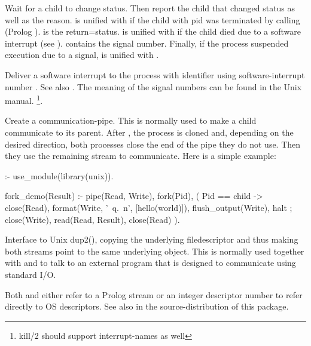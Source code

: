 \documentclass[11pt]{article}
\begin{document}
\begin{description}
Wait for a child to change status. Then report the child that changed
status as well as the reason.  is unified with
 if the child with pid  was terminated
by calling  (Prolog ).  is the
return=status.  is unified with  if
the child died due to a software interrupt (see ). 
contains the signal number. Finally, if the process suspended execution
due to a signal,  is unified with .

Deliver a software interrupt to the process with identifier 
using software-interrupt number .  See also .
The meaning of the signal numbers can be found in the Unix manual.%
\footnote{kill/2 should support interrupt-names as well}.

Create a communication-pipe. This is normally used to make a child
communicate to its parent. After , the process is cloned and,
depending on the desired direction, both processes close the end of the
pipe they do not use. Then they use the remaining stream to communicate.
Here is a simple example:

\begin{code}
:- use_module(library(unix)).

fork_demo(Result) :-
        pipe(Read, Write),
        fork(Pid),
        (   Pid == child
        ->  close(Read),
            format(Write, '~q.~n',
                   [hello(world)]),
            flush_output(Write),
            halt
        ;   close(Write),
            read(Read, Result),
            close(Read)
        ).
\end{code}

\noindent
Interface to Unix dup2(), copying the underlying filedescriptor and thus
making both streams point to the same underlying object. This is
normally used together with  and  to talk to an external
program that is designed to communicate using standard I/O.

Both  and  either refer to a Prolog stream
or an integer descriptor number to refer directly to OS descriptors.
See also  in the source-distribution of this package.


\end{description}
\end{document}
